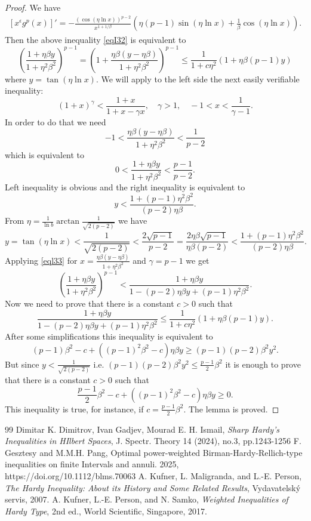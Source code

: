 \documentclass[10pt,a4paper]{amsart}
\numberwithin{equation}{section}
\begin{document}
	\begin{proof}
We have
\begin{align*}
\left[x^\epsilon g^p(x) \right]'=-\frac{(\cos(\eta\ln x))^{p-2}}{x^{1+1/\beta}}
\left(\eta (p-1)\sin(\eta\ln x)+\frac{1}{\beta}\cos(\eta\ln x) \right).
\end{align*}
Then the above inequality \eqref{eqI32} is equivalent to
\[
\left(\frac{1+\eta \beta y}{1+\eta^2\beta^2} \right)^{p-1}
=\left(1+\frac{\eta \beta (y-\eta \beta )}{1+\eta^2\beta^2} \right)^{p-1}
\le\frac{1}{1+c\eta^2}\left( 1+\eta\beta (p-1)y\right)
\]
where $y=\tan(\eta\ln x)$. We will apply to the left side the next easily verifiable inequality:
\begin{equation}\label{eql33}
(1+x)^\gamma<\frac{1+x}{1+x-\gamma x}, \quad \gamma>1, \quad -1<x<\frac{1}{\gamma-1}.
\end{equation}
In order to do that we need
\[
-1<\frac{\eta \beta (y-\eta \beta )}{1+\eta^2\beta^2}<\frac{1}{p-2}
\]
which is equivalent to
\[
0<\frac{1+\eta \beta y}{1+\eta^2\beta^2}<\frac{p-1}{p-2}.
\]
Left inequality is obvious and the right inequality is equivalent to
\[
y<\frac{1+(p-1)\eta^2 \beta^2}{(p-2)\eta\beta}.
\]
From $\eta=\frac{1}{\ln b}\arctan{\frac{1}{\sqrt{2(p-2)}}}$ we have 
\[
y=\tan(\eta\ln x)<\frac{1}{\sqrt{2(p-2)}}<\frac{2\sqrt{p-1}}{p-2}
=\frac{2\eta \beta \sqrt{p-1}}{\eta\beta(p-2)}<\frac{1+(p-1)\eta^2 \beta^2}{(p-2)\eta\beta}.
\]
Applying \eqref{eql33} for $x=\frac{\eta \beta (y-\eta \beta )}{1+\eta^2\beta^2}$ and $\gamma=p-1$ we get
\[
\left(\frac{1+\eta \beta y}{1+\eta^2\beta^2} \right)^{p-1}
<\frac{1+\eta \beta y}{1-(p-2)\eta \beta y+(p-1)\eta^2\beta^2}.
\]
Now we need to prove that there is a constant $c>0$ such that
\[
\frac{1+\eta \beta y}{1-(p-2)\eta \beta y+(p-1)\eta^2\beta^2}
\le\frac{1}{1+c\eta^2}\left( 1+\eta\beta (p-1)y\right).
\]
After some simplifications this inequality is equivalent to
\[
(p-1)\beta^2-c +\left((p-1)^2\beta^2-c \right)\eta\beta y
\geq (p-1)(p-2)\beta^2y^2.
\]
But since $y<\frac{1}{\sqrt{2(p-2)}}$ i.e. $(p-1)(p-2)\beta^2y^2\le \frac{p-1}{2}\beta^2$ it is enough  to prove that there is a constant $c>0$ such that
\[
\frac{p-1}{2}\beta^2-c +\left((p-1)^2\beta^2-c \right)\eta\beta y\geq 0.
\]
This inequality is true, for instance, if $c= \frac{p-1}{2}\beta^2$. The lemma is proved.

\end{proof}


\begin{thebibliography}{99}
 Dimitar K. Dimitrov, Ivan Gadjev, Mourad E. H. Ismail, \textit{Sharp Hardy's Inequalities in HIlbert Spaces}, J. Spectr. Theory 14 (2024), no.3, pp.1243-1256 %
 F. Gesztesy and M.M.H. Pang, Optimal power-weighted Birman-Hardy-Rellich-type inequalities on finite Intervals and annuli. 2025, https://doi.org/10.1112/blms.70063
 A. Kufner, L. Maligranda, and L.-E. Person, \textit{The Hardy Inequality: About its History and Some Related Results}, Vydavatelsk\'{y} servis, 2007.
 A. Kufner, L.-E. Person, and N. Samko, \textit{Weighted Inequalities of Hardy Type}, 2nd ed., World Scientific, Singapore, 2017.
\end{thebibliography}
\end{document}
